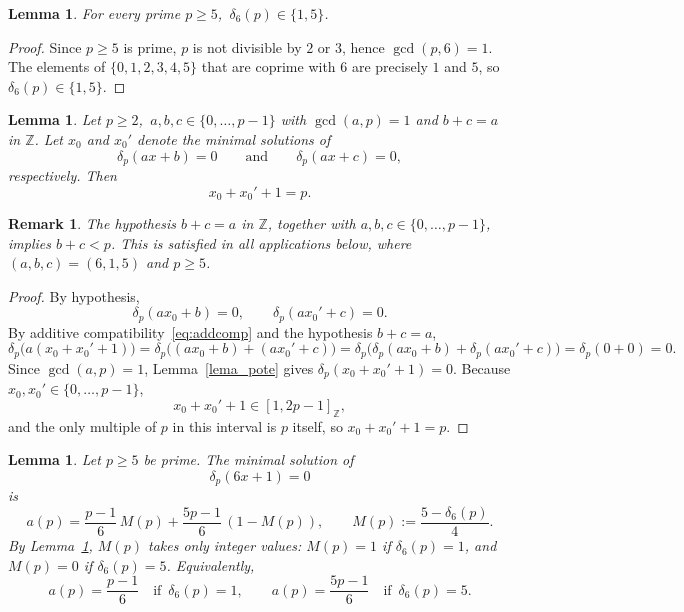 \documentclass[12pt]{article}
\newtheorem{lemma}[theorem]{Lemma}
\newtheorem{remark}[theorem]{Remark}
\begin{document}
\begin{lemma}\label{lem:delta6_prime}
For every prime $p \ge 5$, $\,\delta_6(p) \in \{1,5\}$.
\end{lemma}

\begin{proof}
Since $p \ge 5$ is prime, $p$ is not divisible by $2$ or $3$,
hence $\gcd(p,6)=1$.
The elements of $\{0,1,2,3,4,5\}$ that are coprime with $6$ are
precisely $1$ and $5$, so $\delta_6(p) \in \{1,5\}$.
\end{proof}

\begin{lemma}\label{lema:simet}
Let $p \ge 2$, $\,a,b,c \in \{0,\dots,p-1\}$ with $\gcd(a,p)=1$
and $b+c=a$ in $\mathbb{Z}$.
Let $x_0$ and $x_0'$ denote the minimal solutions of
\[
\delta_p(ax+b)=0 \qquad\text{and}\qquad \delta_p(ax+c)=0,
\]
respectively. Then
\[
x_0 + x_0' + 1 = p.
\]
\end{lemma}

\begin{remark}
The hypothesis $b+c=a$ in $\mathbb{Z}$, together with
$a,b,c \in \{0,\dots,p-1\}$, implies $b+c < p$.
This is satisfied in all applications below, where
$(a,b,c)=(6,1,5)$ and $p \ge 5$.
\end{remark}

\begin{proof}
By hypothesis,
\[
\delta_p(ax_0+b)=0, \qquad \delta_p(ax_0'+c)=0.
\]
By additive compatibility~\eqref{eq:addcomp} and the hypothesis
$b+c=a$,
\[
\delta_p\bigl(a(x_0+x_0'+1)\bigr)
= \delta_p\bigl((ax_0+b)+(ax_0'+c)\bigr)
= \delta_p\bigl(\delta_p(ax_0+b)+\delta_p(ax_0'+c)\bigr)
= \delta_p(0+0)
= 0.
\]
Since $\gcd(a,p)=1$, Lemma~\ref{lema_pote} gives
$\delta_p(x_0+x_0'+1)=0$.
Because $x_0,x_0' \in \{0,\dots,p-1\}$,
\[
x_0+x_0'+1 \in [1,2p-1]_{\mathbb{Z}},
\]
and the only multiple of $p$ in this interval is $p$ itself,
so $x_0+x_0'+1=p$.
\end{proof}

\begin{lemma}\label{thm:sol_min6_funcional_1}
Let $p \ge 5$ be prime. The minimal solution of
\[
\delta_p(6x+1)=0
\]
is
\begin{equation}\label{eq_sola(p)}
a(p)
=
\frac{p-1}{6}\,M(p)
+
\frac{5p-1}{6}\,(1-M(p)),
\qquad
M(p):=\frac{5-\delta_6(p)}{4}.
\end{equation}
By Lemma~\ref{lem:delta6_prime}, $M(p)$ takes only integer values:
$M(p)=1$ if $\delta_6(p)=1$, and $M(p)=0$ if $\delta_6(p)=5$.
Equivalently,
\[
a(p)=\frac{p-1}{6}
\quad\text{if } \, \delta_6(p)=1,
\qquad
a(p)=\frac{5p-1}{6}
\quad\text{if } \, \delta_6(p)=5.
\]
\end{lemma}
\end{document}
